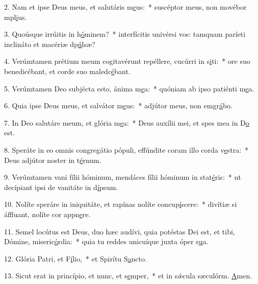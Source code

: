 2. Nam et ipse Deus meus, et salutáris m\uline{e}us:~* suscéptor meus, non movébor mpl\uline{i}us.\par 
3. Quoúsque irrúitis in h\uline{ó}minem?~* interfícitis univérsi vos: tamquam paríeti inclináto et macériæ dp\uline{ú}lsæ?\par 
4. Verúmtamen prétium meum cogitavérunt repéllere, cucúrri in s\uline{i}ti:~* ore suo benedicébant, et corde suo maledc\uline{é}bant.\par 
5. Verúmtamen Deo subjécta esto, ánima m\uline{e}a:~* quóniam ab ipso patiénti m\uline{e}a.\par 
6. Quia ipse Deus meus, et salvátor m\uline{e}us:~* adjútor meus, non emgr\uline{á}bo.\par 
7. In Deo salutáre meum, et glória m\uline{e}a:~* Deus auxílii mei, et spes mea in D\uline{o} est.\par 
8. Speráte in eo omnis congregátio pópuli, effúndite coram illo corda v\uline{e}stra:~* Deus adjútor noster in t\uline{é}rnum.\par 
9. Verúmtamen vani fílii hóminum, mendáces fílii hóminum in stat\uline{é}ris:~* ut decípiant ipsi de vanitáte in d\uline{í}psum.\par 
10. Nolíte speráre in iniquitáte, et rapínas nolíte concup\uline{í}scere:~* divítiæ si áffluant, nolíte cor appn\uline{e}re.\par 
11. Semel locútus est Deus, duo hæc audívi, quia potéstas Dei est, et tibi, Dómine, miseric\uline{ó}rdia:~* quia tu reddes unicuíque juxta óper s\uline{u}a.\par 
12. Glória Patri, et F\uline{í}lio,~* et Spirítu S\uline{a}ncto.\par 
13. Sicut erat in princípio, et nunc, et s\uline{e}mper,~* et in sǽcula sæculórm. \uline{A}men.\par 
